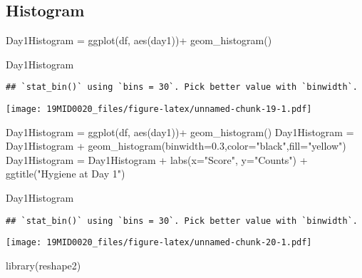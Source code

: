 \documentclass[
]{article}
\newenvironment{Shaded}{\begin{snugshade}}{\end{snugshade}}
\newcommand{\AttributeTok}[1]{\textcolor[rgb]{0.77,0.63,0.00}{#1}}
\newcommand{\FloatTok}[1]{\textcolor[rgb]{0.00,0.00,0.81}{#1}}
\newcommand{\FunctionTok}[1]{\textcolor[rgb]{0.00,0.00,0.00}{#1}}
\newcommand{\NormalTok}[1]{#1}
\newcommand{\OtherTok}[1]{\textcolor[rgb]{0.56,0.35,0.01}{#1}}
\newcommand{\SpecialCharTok}[1]{\textcolor[rgb]{0.00,0.00,0.00}{#1}}
\newcommand{\StringTok}[1]{\textcolor[rgb]{0.31,0.60,0.02}{#1}}
\begin{document}
\hypertarget{histogram}{%
\subsection{Histogram}\label{histogram}}

\begin{Shaded}
\begin{Highlighting}[]
\NormalTok{Day1Histogram }\OtherTok{=} \FunctionTok{ggplot}\NormalTok{(df, }\FunctionTok{aes}\NormalTok{(day1))}\SpecialCharTok{+}
                \FunctionTok{geom\_histogram}\NormalTok{()}

\NormalTok{Day1Histogram}
\end{Highlighting}
\end{Shaded}

\begin{verbatim}
## `stat_bin()` using `bins = 30`. Pick better value with `binwidth`.
\end{verbatim}

\texttt{[image: 19MID0020\_files/figure-latex/unnamed-chunk-19-1.pdf]}

\begin{Shaded}
\begin{Highlighting}[]
\NormalTok{Day1Histogram }\OtherTok{=} \FunctionTok{ggplot}\NormalTok{(df, }\FunctionTok{aes}\NormalTok{(day1))}\SpecialCharTok{+} \FunctionTok{geom\_histogram}\NormalTok{()}
\NormalTok{Day1Histogram }\OtherTok{=}\NormalTok{ Day1Histogram }\SpecialCharTok{+} \FunctionTok{geom\_histogram}\NormalTok{(}\AttributeTok{binwidth=}\FloatTok{0.3}\NormalTok{,}\AttributeTok{color=}\StringTok{"black"}\NormalTok{,}\AttributeTok{fill=}\StringTok{"yellow"}\NormalTok{)}
\NormalTok{Day1Histogram }\OtherTok{=}\NormalTok{ Day1Histogram }\SpecialCharTok{+} \FunctionTok{labs}\NormalTok{(}\AttributeTok{x=}\StringTok{"Score"}\NormalTok{, }\AttributeTok{y=}\StringTok{"Counts"}\NormalTok{) }\SpecialCharTok{+} \FunctionTok{ggtitle}\NormalTok{(}\StringTok{"Hygiene at Day 1"}\NormalTok{)}

\NormalTok{Day1Histogram}
\end{Highlighting}
\end{Shaded}

\begin{verbatim}
## `stat_bin()` using `bins = 30`. Pick better value with `binwidth`.
\end{verbatim}

\texttt{[image: 19MID0020\_files/figure-latex/unnamed-chunk-20-1.pdf]}

\begin{Shaded}
\begin{Highlighting}[]
\FunctionTok{library}\NormalTok{(reshape2)}
\end{Highlighting}
\end{Shaded}
\end{document}
